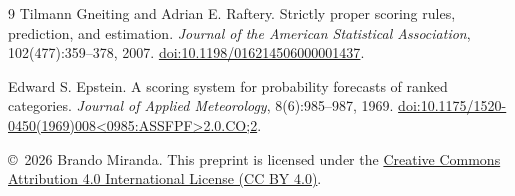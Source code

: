 \begin{thebibliography}{9}
Tilmann Gneiting and Adrian E. Raftery.
Strictly proper scoring rules, prediction, and estimation.
\emph{Journal of the American Statistical Association}, 102(477):359--378, 2007.
\href{https://doi.org/10.1198/016214506000001437}{doi:10.1198/016214506000001437}.

Edward S. Epstein.
A scoring system for probability forecasts of ranked categories.
\emph{Journal of Applied Meteorology}, 8(6):985--987, 1969.
\href{https://doi.org/10.1175/1520-0450(1969)008\%3C0985:ASSFPF\%3E2.0.CO;2}{doi:10.1175/1520-0450(1969)008\textless0985:ASSFPF\textgreater2.0.CO;2}.
\end{thebibliography}
\bigskip
\noindent\small\copyright\ 2026 Brando Miranda.
This preprint is licensed under the \href{https://creativecommons.org/licenses/by/4.0/}{Creative Commons Attribution 4.0 International License (CC BY 4.0)}.
